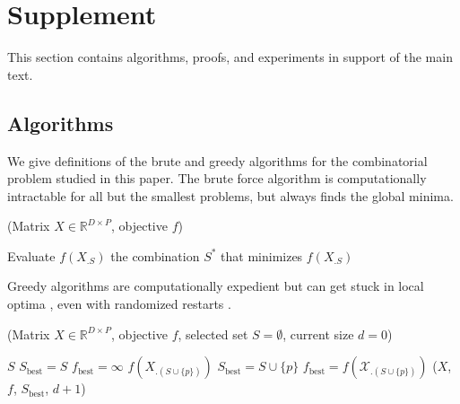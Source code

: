 \section{Supplement}

This section contains algorithms, proofs, and experiments in support of the main text.

\subsection{Algorithms}
\label{sec:algorithms}

We give definitions of the brute and greedy algorithms for the combinatorial problem studied in this paper.
The brute force algorithm is computationally intractable for all but the smallest problems, but always finds the global minima.

\begin{algorithm}[H]
\caption{\brute(Matrix ${X} \in \mathbb{R}^{D \times P}$, objective $f$)}
\begin{algorithmic}[1]
    \STATE Evaluate $f({X}_{.S})$
\ENDFOR
{} the combination $S^*$ that minimizes $f({X}_{.S})$
\end{algorithmic}
\end{algorithm}

Greedy algorithms are computationally expedient but can get stuck in local optima \citep{Cormen, Russell-09}, even with randomized restarts \citep{Dick2014HowMR}.

\begin{algorithm}[H]
\caption{\greedy(Matrix ${X} \in \mathbb{R}^{D \times P}$, objective $f$, selected set $S = \emptyset$, current size $d=0$)}
\begin{algorithmic}[1]
     $S$
\ELSE
     $S_{\text{best}} = S$
     $f_{\text{best}} = \infty$
         $f({X}_{.(S \cup \{p\})})$
             $S_{\text{best}} = S \cup \{p\}$
             $f_{\text{best}} = f(\mathcal{X}_{.(S \cup \{p\})})$
        \ENDIF
    \ENDFOR
     \greedy(${X}$, $f$, $S_{\text{best}}$, $d+1$)
\ENDIF
\end{algorithmic}
\end{algorithm}

\newpage

